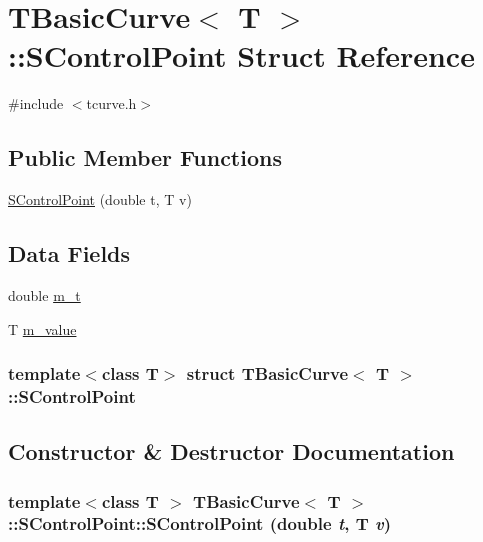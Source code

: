 \hypertarget{structTBasicCurve_1_1SControlPoint}{
\section{TBasicCurve$<$ T $>$::SControlPoint Struct Reference}
\label{structTBasicCurve_1_1SControlPoint}
}


{\ttfamily \#include $<$tcurve.h$>$}\subsection*{Public Member Functions}
\begin{DoxyCompactItemize}
\item 
\hyperlink{structTBasicCurve_1_1SControlPoint_ae095a644bc15de4edf1bd008c91af2b3}{SControlPoint} (double t, T v)
\end{DoxyCompactItemize}
\subsection*{Data Fields}
\begin{DoxyCompactItemize}
\item 
double \hyperlink{structTBasicCurve_1_1SControlPoint_addc65fabea5333b97fd43822a690caf7}{m\_\-t}
\item 
T \hyperlink{structTBasicCurve_1_1SControlPoint_a43554a3e5ce6ec6c57abb9a17ca25cee}{m\_\-value}
\end{DoxyCompactItemize}
\subsubsection*{template$<$class T$>$ struct TBasicCurve$<$ T $>$::SControlPoint}



\subsection{Constructor \& Destructor Documentation}
\hypertarget{structTBasicCurve_1_1SControlPoint_ae095a644bc15de4edf1bd008c91af2b3}{
\subsubsection[{SControlPoint}]{\setlength{\rightskip}{0pt plus 5cm}template$<$class T $>$ {\bf TBasicCurve}$<$ T $>$::SControlPoint::SControlPoint (double {\em t}, \/  T {\em v})}}
\label{structTBasicCurve_1_1SControlPoint_ae095a644bc15de4edf1bd008c91af2b3}


